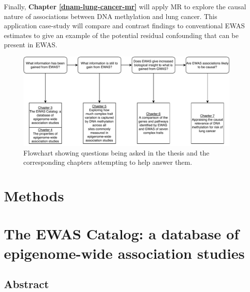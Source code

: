 \documentclass[11pt,twoside]{bristolthesis}
\begin{document}
Finally, \textbf{Chapter \ref{dnam-lung-cancer-mr}} will apply MR to explore the causal nature of associations between DNA methylation and lung cancer. This application case-study will compare and contrast findings to conventional EWAS estimates to give an example of the potential residual confounding that can be present in EWAS.


\begin{figure}
\centering
\includegraphics{figure/01-introduction/thesis-flowchart.pdf}
\caption{\label{fig:thesis-flowchart}Flowchart showing questions being asked in the thesis and the corresponding chapters attempting to help answer them.}
\end{figure}
\hypertarget{methods}{%
\chapter{Methods}\label{methods}}

\hypertarget{ewas-catalog}{%
\chapter{The EWAS Catalog: a database of epigenome-wide association studies}\label{ewas-catalog}}

\hypertarget{abstract}{%
\section{Abstract}\label{abstract}}
\end{document}
